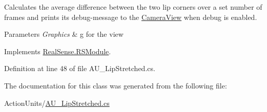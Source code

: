 Calculates the average difference between the two lip corners over a set number of frames and prints its\textquotesingle{} debug-\/message to the \hyperlink{class_real_sense_1_1_camera_view}{Camera\+View} when debug is enabled. 
\begin{DoxyParams}{Parameters}
{\em Graphics} & g for the view \\
\hline
\end{DoxyParams}


Implements \hyperlink{class_real_sense_1_1_r_s_module_a2ec830b7932ee7c0077d473f81c73867}{Real\+Sense.\+R\+S\+Module}.



Definition at line 48 of file A\+U\+\_\+\+Lip\+Stretched.\+cs.



The documentation for this class was generated from the following file\+:\begin{DoxyCompactItemize}
\item 
Action\+Units/\hyperlink{_a_u___lip_stretched_8cs}{A\+U\+\_\+\+Lip\+Stretched.\+cs}\end{DoxyCompactItemize}

